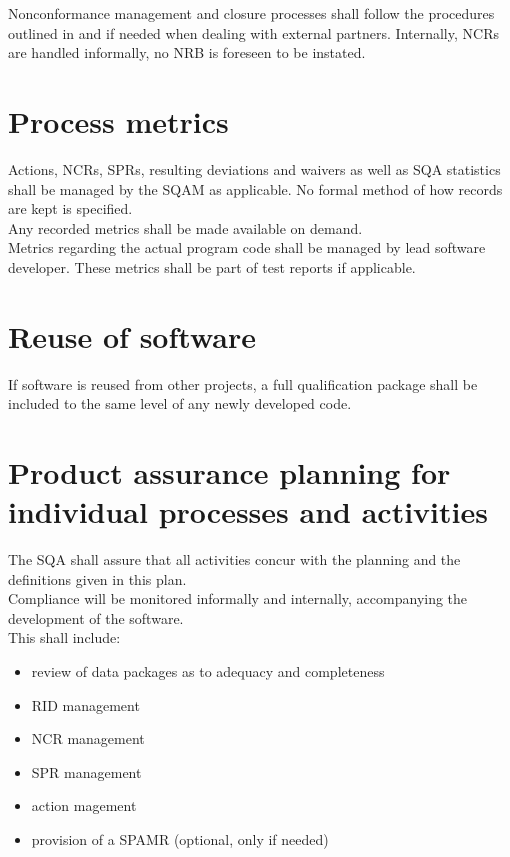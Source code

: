 \noindent
Nonconformance management and closure processes shall follow the procedures
outlined in \cite{ECSS80C} and \cite{ECSSQ1009C} if needed when dealing with
external partners. Internally, \glspl{NCR} are handled informally, no \gls{NRB}
is foreseen to be instated.


\section{Process metrics}

Actions, \glspl{NCR}, \glspl{SPR}, resulting deviations and waivers as
well as \gls{SQA} statistics shall be managed by the \gls{SQAM} as applicable.
No formal method of how records are kept is specified.\\

\noindent
Any recorded metrics shall be made available on demand.\\

\noindent
Metrics regarding the actual program code shall be managed by lead software
developer. These metrics shall be part of test reports if applicable.


\section{Reuse of software}

If software is reused from other projects, a full qualification package shall
be included to the same level of any newly developed code.



\section{Product assurance planning for individual processes and activities}

The \gls{SQA} shall assure that all activities concur with the planning and the
definitions given in this plan.\\

\noindent
Compliance will be monitored informally and internally, accompanying the
development of the software.\\

\noindent
This shall include:

\begin{itemize}
	\item review of data packages as to adequacy and completeness
	\item \gls{RID} management
	\item \gls{NCR} management
	\item \gls{SPR} management
	\item action magement
	\item provision of a \gls{SPAMR} (optional, only if needed)
\end{itemize}


